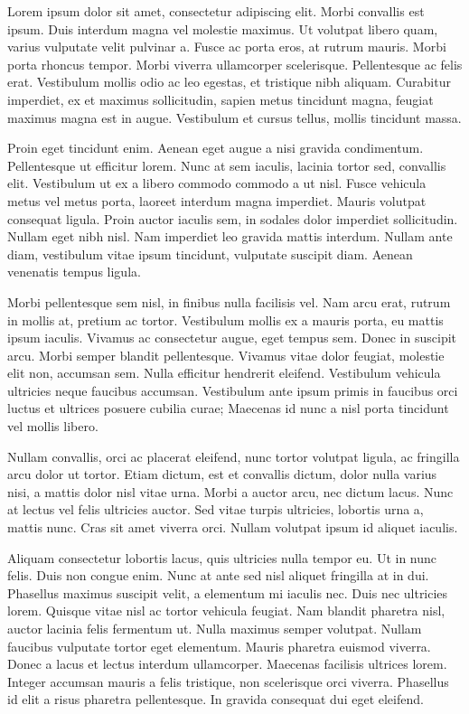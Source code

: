

Lorem ipsum dolor sit amet, consectetur adipiscing elit. Morbi convallis est ipsum. Duis interdum magna vel molestie maximus. Ut volutpat libero quam, varius vulputate velit pulvinar a. Fusce ac porta eros, at rutrum mauris. Morbi porta rhoncus tempor. Morbi viverra ullamcorper scelerisque. Pellentesque ac felis erat. Vestibulum mollis odio ac leo egestas, et tristique nibh aliquam. Curabitur imperdiet, ex et maximus sollicitudin, sapien metus tincidunt magna, feugiat maximus magna est in augue. Vestibulum et cursus tellus, mollis tincidunt massa.

Proin eget tincidunt enim. Aenean eget augue a nisi gravida condimentum. Pellentesque ut efficitur lorem. Nunc at sem iaculis, lacinia tortor sed, convallis elit. Vestibulum ut ex a libero commodo commodo a ut nisl. Fusce vehicula metus vel metus porta, laoreet interdum magna imperdiet. Mauris volutpat consequat ligula. Proin auctor iaculis sem, in sodales dolor imperdiet sollicitudin. Nullam eget nibh nisl. Nam imperdiet leo gravida mattis interdum. Nullam ante diam, vestibulum vitae ipsum tincidunt, vulputate suscipit diam. Aenean venenatis tempus ligula.

Morbi pellentesque sem nisl, in finibus nulla facilisis vel. Nam arcu erat, rutrum in mollis at, pretium ac tortor. Vestibulum mollis ex a mauris porta, eu mattis ipsum iaculis. Vivamus ac consectetur augue, eget tempus sem. Donec in suscipit arcu. Morbi semper blandit pellentesque. Vivamus vitae dolor feugiat, molestie elit non, accumsan sem. Nulla efficitur hendrerit eleifend. Vestibulum vehicula ultricies neque faucibus accumsan. Vestibulum ante ipsum primis in faucibus orci luctus et ultrices posuere cubilia curae; Maecenas id nunc a nisl porta tincidunt vel mollis libero.

Nullam convallis, orci ac placerat eleifend, nunc tortor volutpat ligula, ac fringilla arcu dolor ut tortor. Etiam dictum, est et convallis dictum, dolor nulla varius nisi, a mattis dolor nisl vitae urna. Morbi a auctor arcu, nec dictum lacus. Nunc at lectus vel felis ultricies auctor. Sed vitae turpis ultricies, lobortis urna a, mattis nunc. Cras sit amet viverra orci. Nullam volutpat ipsum id aliquet iaculis.

Aliquam consectetur lobortis lacus, quis ultricies nulla tempor eu. Ut in nunc felis. Duis non congue enim. Nunc at ante sed nisl aliquet fringilla at in dui. Phasellus maximus suscipit velit, a elementum mi iaculis nec. Duis nec ultricies lorem. Quisque vitae nisl ac tortor vehicula feugiat. Nam blandit pharetra nisl, auctor lacinia felis fermentum ut. Nulla maximus semper volutpat. Nullam faucibus vulputate tortor eget elementum. Mauris pharetra euismod viverra. Donec a lacus et lectus interdum ullamcorper. Maecenas facilisis ultrices lorem. Integer accumsan mauris a felis tristique, non scelerisque orci viverra. Phasellus id elit a risus pharetra pellentesque. In gravida consequat dui eget eleifend.

